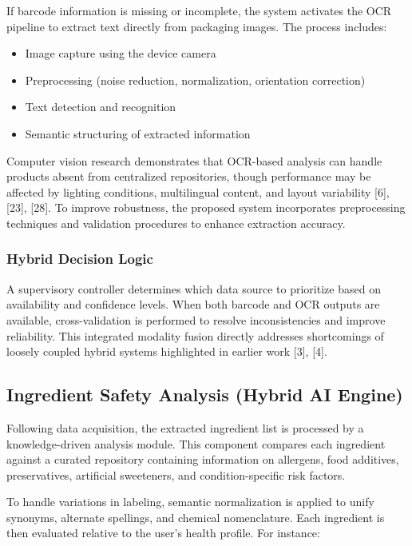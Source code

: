 \documentclass[conference]{IEEEtran}
\begin{document}
If barcode information is missing or incomplete, the system activates the OCR pipeline to extract text directly from packaging images. The process includes:

\begin{itemize}
    \item Image capture using the device camera
    \item Preprocessing (noise reduction, normalization, orientation correction)
    \item Text detection and recognition
    \item Semantic structuring of extracted information
\end{itemize}

Computer vision research demonstrates that OCR-based analysis can handle products absent from centralized repositories, though performance may be affected by lighting conditions, multilingual content, and layout variability [6], [23], [28]. To improve robustness, the proposed system incorporates preprocessing techniques and validation procedures to enhance extraction accuracy.

\subsubsection{Hybrid Decision Logic}

A supervisory controller determines which data source to prioritize based on availability and confidence levels. When both barcode and OCR outputs are available, cross-validation is performed to resolve inconsistencies and improve reliability. This integrated modality fusion directly addresses shortcomings of loosely coupled hybrid systems highlighted in earlier work [3], [4].

\subsection{Ingredient Safety Analysis (Hybrid AI Engine)}

Following data acquisition, the extracted ingredient list is processed by a knowledge-driven analysis module. This component compares each ingredient against a curated repository containing information on allergens, food additives, preservatives, artificial sweeteners, and condition-specific risk factors.

To handle variations in labeling, semantic normalization is applied to unify synonyms, alternate spellings, and chemical nomenclature. Each ingredient is then evaluated relative to the user’s health profile. For instance:
\end{document}
